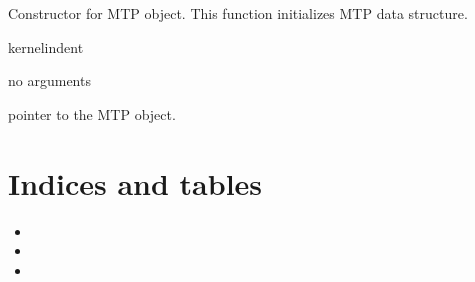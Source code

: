 \documentclass[letterpaper,10pt,english]{sphinxmanual}
\begin{document}
\begin{fulllineitems}
\label{\detokenize{mtpinst.c:c.MTP_init}}
\pysigstartsignatures
\pysigstartmultiline
{}
\pysigstopmultiline
\pysigstopsignatures
\sphinxAtStartPar
Constructor for MTP object. This function initializes MTP data structure.

\end{fulllineitems}


\begin{sphinxuseclass}{kernelindent}
\sphinxAtStartPar
{}
\begin{description}
\sphinxAtStartPar
no arguments

\end{description}

\sphinxAtStartPar
{}

\sphinxAtStartPar
pointer to the MTP object.

\end{sphinxuseclass}

\chapter{Indices and tables}
\label{\detokenize{index:indices-and-tables}}\begin{itemize}
\item {} 
\sphinxAtStartPar
{}

\item {} 
\sphinxAtStartPar
{}

\item {} 
\sphinxAtStartPar
{}

\end{itemize}



\renewcommand{\indexname}{Index}
\printindex
\end{document}
